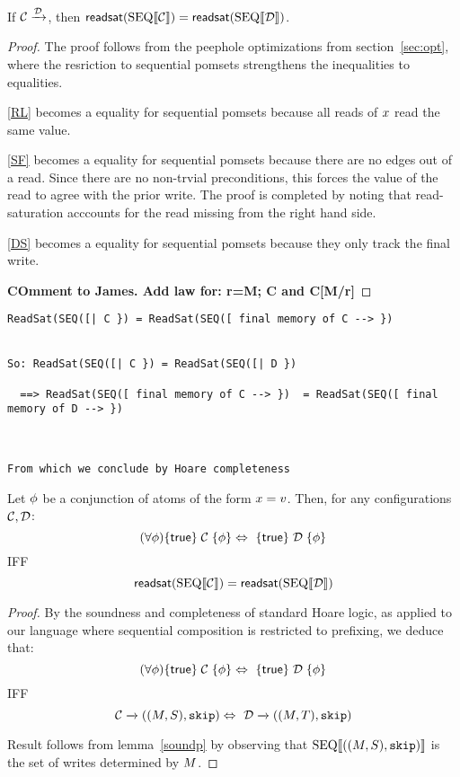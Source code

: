 \begin{lemma}\label{soundp}
If ${\mathcal C} \xrightarrow {{\mathcal D}}$, then $\mathsf{readsat}({\rm SEQ}\llbracket{\mathcal C}\rrbracket) = \mathsf{readsat}({\rm SEQ}\llbracket{\mathcal D}\rrbracket)$.
\end{lemma}
\begin{proof}
The proof follows from the peephole optimizations from section~\ref{sec:opt}, where the resriction to sequential pomsets strengthens the inequalities to equalities.    

\eqref{RL} becomes a equality for sequential pomsets because all reads of $x$ read the same value.  

\eqref{SF} becomes a equality for sequential pomsets because there are no edges out of a read. Since there are no non-trvial preconditions, this forces the value of the read to agree with the prior write.   The proof is completed by noting that read-saturation acccounts for the read missing from the right hand side.

\eqref{DS}  becomes a equality for sequential pomsets because they only track the final write. 

{\bf COmment to James.  Add law for:  r=M; C and C[M/r]}
\end{proof}

\begin{verbatim}
ReadSat(SEQ([| C }) = ReadSat(SEQ([ final memory of C --> }) 


So: ReadSat(SEQ([| C }) = ReadSat(SEQ([| D })

  ==> ReadSat(SEQ([ final memory of C --> })  = ReadSat(SEQ([ final memory of D --> }) 

 

From which we conclude by Hoare completeness
\end{verbatim}

\begin{corollary}
Let $\phi$ be a conjunction of atoms of the form $x = v$.  Then, for any configurations ${\mathcal C}, {\mathcal D}$:
\[ (\forall \phi) \{\mathsf{true}\}\allowbreak\;{\mathcal C}\;\allowbreak\{\phi\} \Leftrightarrow\   \{\mathsf{true}\}\allowbreak\;{\mathcal D}\;\allowbreak\{\phi\}  \]
IFF
\[ \mathsf{readsat}({\rm SEQ}\llbracket{\mathcal C}\rrbracket) = \mathsf{readsat}({\rm SEQ}\llbracket{\mathcal D}\rrbracket) \]
\end{corollary}
\begin{proof}
By the soundness and completeness of standard Hoare logic, as applied to our language where sequential composition is restricted to prefixing, we deduce that:
\[ (\forall \phi) \{\mathsf{true}\}\allowbreak\;{\mathcal C}\;\allowbreak\{\phi\} \Leftrightarrow\   \{\mathsf{true}\}\allowbreak\;{\mathcal D}\;\allowbreak\{\phi\} 
\]
IFF
\[ {\mathcal C} \xrightarrow{} ((M,S), \texttt{skip}) \Leftrightarrow\  {\mathcal D} \xrightarrow{} ((M,T), \texttt{skip}) \]

Result follows from lemma~\ref{soundp} by observing that ${\rm SEQ}\llbracket((M,S), \texttt{skip})\rrbracket$ is the set of writes determined by $M$.
\end{proof}


